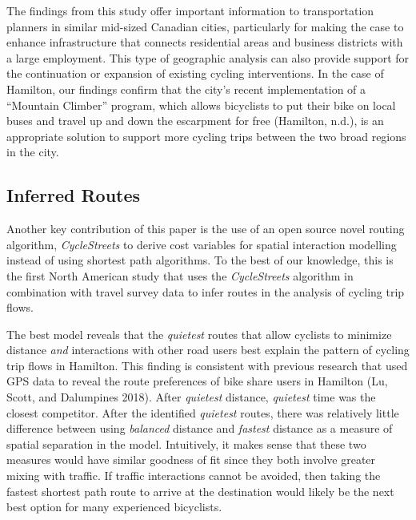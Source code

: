 \documentclass[smallextended]{svjour3}       %
\begin{document}
The findings from this study offer important information to
transportation planners in similar mid-sized Canadian cities,
particularly for making the case to enhance infrastructure that connects
residential areas and business districts with a large employment. This
type of geographic analysis can also provide support for the
continuation or expansion of existing cycling interventions. In the case
of Hamilton, our findings confirm that the city's recent implementation
of a ``Mountain Climber'' program, which allows bicyclists to put their
bike on local buses and travel up and down the escarpment for free
(Hamilton, n.d.), is an appropriate solution to support more cycling
trips between the two broad regions in the city.

\hypertarget{inferred-routes}{%
\subsection{Inferred Routes}\label{inferred-routes}}

Another key contribution of this paper is the use of an open source
novel routing algorithm, \emph{CycleStreets} to derive cost variables
for spatial interaction modelling instead of using shortest path
algorithms. To the best of our knowledge, this is the first North
American study that uses the \emph{CycleStreets} algorithm in
combination with travel survey data to infer routes in the analysis of
cycling trip flows.

The best model reveals that the \emph{quietest} routes that allow
cyclists to minimize distance \emph{and} interactions with other road
users best explain the pattern of cycling trip flows in Hamilton. This
finding is consistent with previous research that used GPS data to
reveal the route preferences of bike share users in Hamilton (Lu, Scott,
and Dalumpines 2018). After \emph{quietest} distance, \emph{quietest}
time was the closest competitor. After the identified \emph{quietest}
routes, there was relatively little difference between using
\emph{balanced} distance and \emph{fastest} distance as a measure of
spatial separation in the model. Intuitively, it makes sense that these
two measures would have similar goodness of fit since they both involve
greater mixing with traffic. If traffic interactions cannot be avoided,
then taking the fastest shortest path route to arrive at the destination
would likely be the next best option for many experienced bicyclists.
\end{document}
